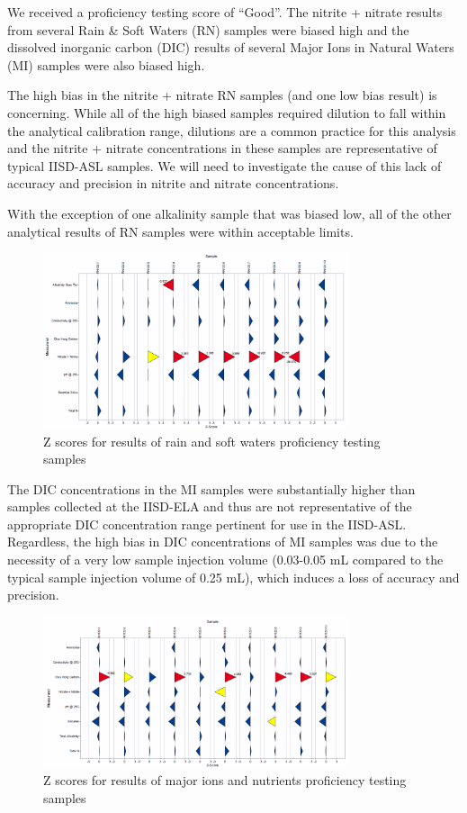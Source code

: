 \documentclass[
]{article}
\begin{document}
We received a proficiency testing score of ``Good''. The nitrite +
nitrate results from several Rain \& Soft Waters (RN) samples were
biased high and the dissolved inorganic carbon (DIC) results of several
Major Ions in Natural Waters (MI) samples were also biased high.
\pagebreak

The high bias in the nitrite + nitrate RN samples (and one low bias
result) is concerning. While all of the high biased samples required
dilution to fall within the analytical calibration range, dilutions are
a common practice for this analysis and the nitrite + nitrate
concentrations in these samples are representative of typical IISD-ASL
samples. We will need to investigate the cause of this lack of accuracy
and precision in nitrite and nitrate concentrations.

With the exception of one alkalinity sample that was biased low, all of
the other analytical results of RN samples were within acceptable
limits.

\begin{figure}[h]
\centering
  \includegraphics[width=0.8\textwidth]{2023_PT_RN_zscores.png}
  \caption{Z scores for results of rain and soft waters proficiency testing samples}
\end{figure}

The DIC concentrations in the MI samples were substantially higher than
samples collected at the IISD-ELA and thus are not representative of the
appropriate DIC concentration range pertinent for use in the IISD-ASL.
Regardless, the high bias in DIC concentrations of MI samples was due to
the necessity of a very low sample injection volume (0.03-0.05 mL
compared to the typical sample injection volume of 0.25 mL), which
induces a loss of accuracy and precision.

\begin{figure}[h]
\centering
  \includegraphics[width=0.8\textwidth]{2023_PT_MI_zscores.png}
  \caption{Z scores for results of major ions and nutrients proficiency testing samples}
\end{figure}
\pagebreak
\end{document}
